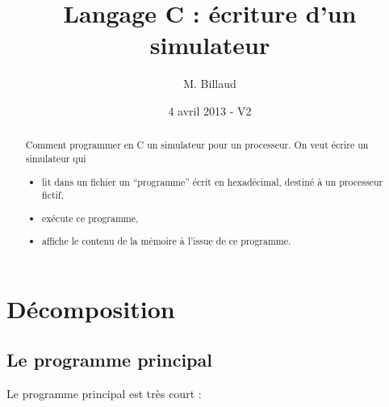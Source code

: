 \documentclass[10pt]{article}
\title{Langage C : écriture d'un simulateur}
\author{M. Billaud}
\date{4 avril 2013 - V2}
\begin{document}
\maketitle

\begin{abstract}
Comment programmer en C un simulateur pour un processeur.
On veut écrire un simulateur qui 
\begin{itemize}
\item lit dans un fichier un ``programme'' écrit en hexadécimal, 
destiné à un processeur fictif,
\item exécute ce programme,
\item affiche le contenu de la mémoire à l'issue de ce programme.
\end{itemize}


\end{abstract}

\tableofcontents

\newpage

\section{Décomposition}

\subsection{Le programme principal}

Le programme principal est très court :


\end{document}
